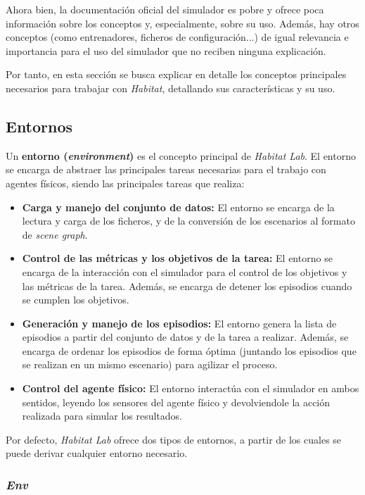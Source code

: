 Ahora bien, la documentación oficial del simulador es pobre y ofrece poca información sobre los conceptos y, especialmente, sobre su uso. Además, hay otros conceptos (como entrenadores, ficheros de configuración...) de igual relevancia e importancia para el uso del simulador que no reciben ninguna explicación. 

Por tanto, en esta sección se busca explicar en detalle los conceptos principales necesarios para trabajar con \textit{Habitat}, detallando sus características y su uso.

\subsection{Entornos}

Un \textbf{entorno (\textit{environment})} es el concepto principal de \textit{Habitat Lab}. El entorno se encarga de abstraer las principales tareas necesarias para el trabajo con agentes físicos, siendo las principales tareas que realiza:

\begin{itemize}
	\item \textbf{Carga y manejo del conjunto de datos:} El entorno se encarga de la lectura y carga de los ficheros, y de la conversión de los escenarios al formato de \textit{scene graph}. 
	\item \textbf{Control de las métricas y los objetivos de la tarea:} El entorno se encarga de la interacción con el simulador para el control de los objetivos y las métricas de la tarea. Además, se encarga de detener los episodios cuando se cumplen los objetivos.
	\item \textbf{Generación y manejo de los episodios:} El entorno genera la lista de episodios a partir del conjunto de datos y de la tarea a realizar. Además, se encarga de ordenar los episodios de forma óptima (juntando los episodios que se realizan en un mismo escenario) para agilizar el proceso.
	\item \textbf{Control del agente físico:} El entorno interactúa con el simulador en ambos sentidos, leyendo los sensores del agente físico y devolviendole la acción realizada para simular los resultados.
\end{itemize}

Por defecto, \textit{Habitat Lab} ofrece dos tipos de entornos, a partir de los cuales se puede derivar cualquier entorno necesario.

\subsubsection{\textit{Env}}

